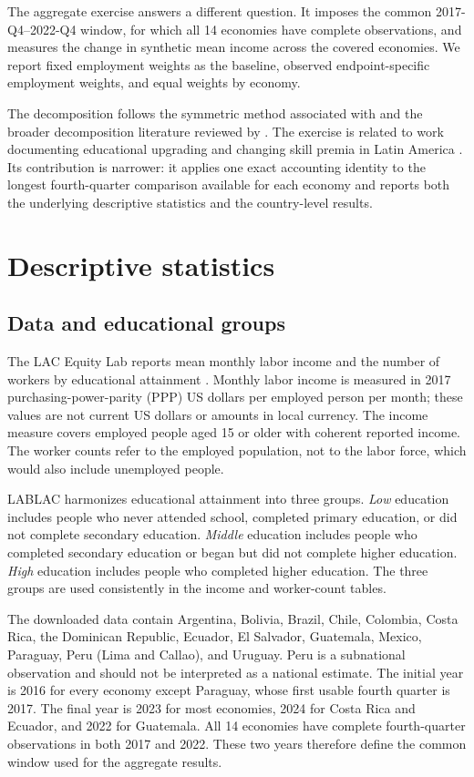 \documentclass[11pt]{article}
\begin{document}
The aggregate exercise answers a different question. It imposes the common
2017-Q4--2022-Q4 window, for which all 14 economies have complete observations,
and measures the change in synthetic mean income across the covered
economies. We report fixed employment weights as the baseline, observed
endpoint-specific employment weights, and equal weights by economy.

The decomposition follows the symmetric method associated with
\citet{kitagawa1955} and the broader decomposition literature reviewed by
\citet{fortinlemieuxfirpo2011}. The exercise is related to work documenting
educational upgrading and changing skill premia in Latin America
\citep{gasparinietal2011,azevedoetal2013,messinadasilva2019}. Its contribution
is narrower: it applies one exact accounting identity to the longest
fourth-quarter comparison available for each economy and reports both the
underlying descriptive statistics and the country-level results.

\section{Descriptive statistics}

\subsection{Data and educational groups}

The LAC Equity Lab reports mean monthly labor income and the number of workers
by educational attainment \citep{lablac}. Monthly labor income is measured in
2017 purchasing-power-parity (PPP) US dollars per employed person per month;
these values are not current US dollars or amounts in local currency. The
income measure covers employed people aged 15 or older with coherent reported
income. The worker counts refer to the employed population, not to the labor
force, which would also include unemployed people.

LABLAC harmonizes educational attainment into three groups. \emph{Low}
education includes people who never attended school, completed primary
education, or did not complete secondary education. \emph{Middle} education
includes people who completed secondary education or began but did not
complete higher education. \emph{High} education includes people who
completed higher education. The three groups are used consistently in the
income and worker-count tables.

The downloaded data contain Argentina, Bolivia, Brazil, Chile, Colombia,
Costa Rica, the Dominican Republic, Ecuador, El Salvador, Guatemala, Mexico,
Paraguay, Peru (Lima and Callao), and Uruguay. Peru is a subnational
observation and should not be interpreted as a national estimate. The initial
year is 2016 for every economy except Paraguay, whose first usable fourth
quarter is 2017. The final year is 2023 for most economies, 2024 for Costa
Rica and Ecuador, and 2022 for Guatemala. All 14 economies have complete
fourth-quarter observations in both 2017 and 2022. These two years therefore
define the common window used for the aggregate results.
\end{document}
